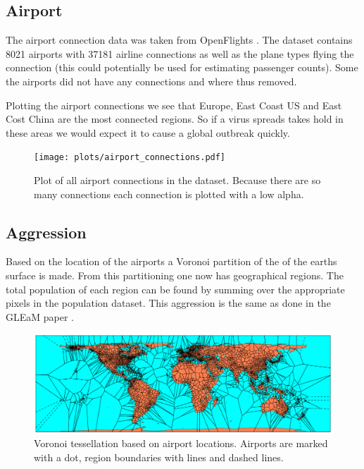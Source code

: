 \subsection{Airport}

The airport connection data was taken from OpenFlights \cite{openflights}. The dataset contains 8021 airports with 37181 airline connections as well as the plane types flying the connection (this could potentially be used for estimating passenger counts). Some the airports did not have any connections and where thus removed.

Plotting the airport connections we see that Europe, East Coast US and East Cost China are the most connected regions. So if a virus spreads takes hold in these areas we would expect it to cause a global outbreak quickly.

\begin{figure}[H]
	\centering
	\texttt{[image: plots/airport\_connections.pdf]}
	\caption{Plot of all airport connections in the dataset. Because there are so many connections each connection is plotted with a low alpha.}
\end{figure}

\subsection{Aggression}

Based on the location of the airports a Voronoi partition of the of the earths surface is made. From this partitioning one now has geographical regions. The total population of each region can be found by summing over the appropriate pixels in the population dataset. This aggression is the same as done in the GLEaM paper \cite{GLEaM}.

\begin{figure}[H]
	\centering
	\includegraphics[width=1.0 \textwidth]{plots/voronoi.pdf}
	\caption{Voronoi tessellation based on airport locations. Airports are marked with a dot, region boundaries with lines and dashed lines.}
\end{figure}

